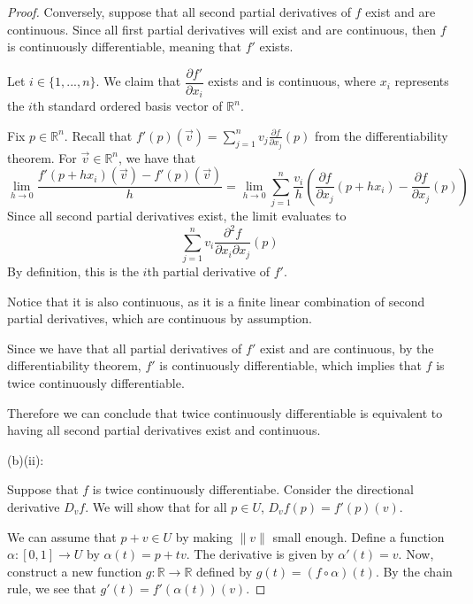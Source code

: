 \documentclass{article}
\theoremstyle{plain} %
\numberwithin{thm}{section} %
\theoremstyle{definition}
\begin{document}
\begin{proof}
            Conversely, suppose that all second partial derivatives of \(f\) exist and are continuous. Since all first partial derivatives will exist and are continuous, then \(f\) is continuously differentiable, meaning that \(f'\) exists.

            Let \(i \in \{1, ..., n\}\). We claim that \(\dfrac{\partial f'}{\partial x_i}\) exists and is continuous, where \(x_i\) represents the \(i\)th standard ordered basis vector of \(\mathbb{R}^n\).

            Fix \(p \in \mathbb{R}^n\). Recall that \(f'(p)(\vec{v}) = \sum_{j=1} ^n v_j \frac{\partial f}{\partial x_j}(p)\) from the differentiability theorem. For \(\vec{v} \in \mathbb{R}^n\), we have that
            \[
                \lim_{h \to 0} \frac{f'(p + hx_i)(\vec{v}) - f'(p)(\vec{v})}{h} = \lim_{h \to 0} \sum_{j=1} ^n \frac{v_i}{h}\left( \frac{\partial f}{\partial x_j} (p + hx_i) - \frac{\partial f}{\partial x_j} (p) \right)
            \]
            Since all second partial derivatives exist, the limit evaluates to
            \[
                \sum_{j=1} ^n v_i \frac{\partial ^2 f}{\partial x_i \partial x_j} (p)
            \]
            By definition, this is the \(i\)th partial derivative of \(f'\).

            Notice that it is also continuous, as it is a finite linear combination of second partial derivatives, which are continuous by assumption.
            
            Since we have that all partial derivatives of \(f'\) exist and are continuous, by the differentiability theorem, \(f'\) is continuously differentiable, which implies that \(f\) is twice continuously differentiable.

            Therefore we can conclude that twice continuously differentiable is equivalent to having all second partial derivatives exist and continuous.

            \medskip

            (b)(ii):

            Suppose that \(f\) is twice continuously differentiabe. Consider the directional derivative \(D_v f\). We will show that for all \(p\in U\), \(D_v f(p) = f'(p)(v)\).

            We can assume that \(p + v \in U\) by making \(\|v\|\) small enough. Define a function \(\alpha : [0,1] \to U\) by \(\alpha (t) = p + tv\). The derivative is given by \(\alpha '(t) = v\). Now, construct a new function \(g : \mathbb{R} \to \mathbb{R}\) defined by \(g(t) = (f \circ \alpha) (t)\). By the chain rule, we see that \(g'(t) = f'(\alpha (t)) (v)\).


\end{proof}
\end{document}
